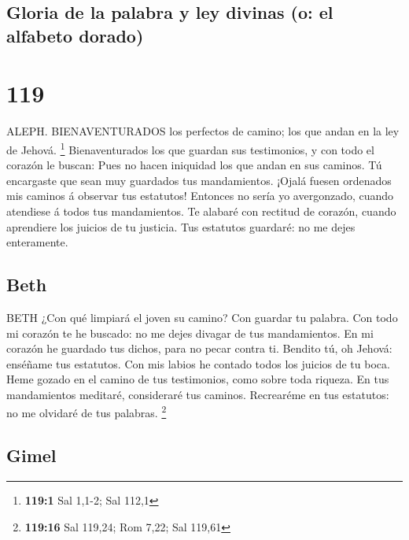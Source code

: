 \hypertarget{gloria-de-la-palabra-y-ley-divinas-o-el-alfabeto-dorado}{%
\subsection{Gloria de la palabra y ley divinas (o: el alfabeto
dorado)}\label{gloria-de-la-palabra-y-ley-divinas-o-el-alfabeto-dorado}}

\hypertarget{section-118}{%
\section{119}\label{section-118}}

 ALEPH. BIENAVENTURADOS los perfectos de camino; los que
andan en la ley de Jehová. \footnote{\textbf{119:1} Sal 1,1-2; Sal 112,1}
 Bienaventurados los que guardan sus testimonios, y con todo
el corazón le buscan:  Pues no hacen iniquidad los que andan
en sus caminos.  Tú encargaste que sean muy guardados tus
mandamientos.  ¡Ojalá fuesen ordenados mis caminos á
observar tus estatutos!  Entonces no sería yo avergonzado,
cuando atendiese á todos tus mandamientos.  Te alabaré con
rectitud de corazón, cuando aprendiere los juicios de tu justicia.
 Tus estatutos guardaré: no me dejes enteramente.

\hypertarget{beth}{%
\subsection{Beth}\label{beth}}

 BETH ¿Con qué limpiará el joven su camino? Con guardar tu
palabra.  Con todo mi corazón te he buscado: no me dejes
divagar de tus mandamientos.  En mi corazón he guardado tus
dichos, para no pecar contra ti.  Bendito tú, oh Jehová:
enséñame tus estatutos.  Con mis labios he contado todos
los juicios de tu boca.  Heme gozado en el camino de tus
testimonios, como sobre toda riqueza.  En tus mandamientos
meditaré, consideraré tus caminos.  Recrearéme en tus
estatutos: no me olvidaré de tus palabras. \footnote{\textbf{119:16} Sal
  119,24; Rom 7,22; Sal 119,61}

\hypertarget{gimel}{%
\subsection{Gimel}\label{gimel}}

